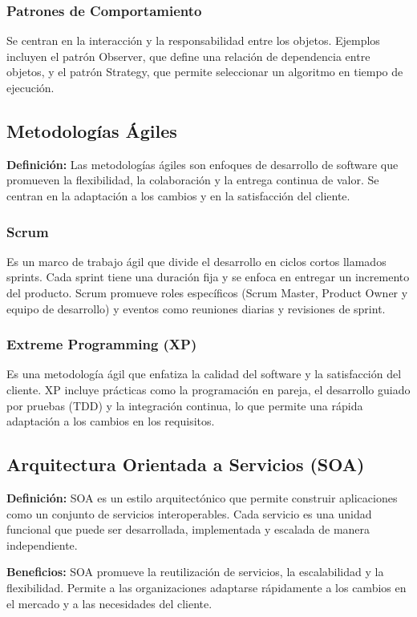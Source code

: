 \documentclass{article}
\begin{document}
\subsubsection{Patrones de Comportamiento}
Se centran en la interacción y la responsabilidad entre los objetos. Ejemplos incluyen el patrón Observer, que define una relación de dependencia entre objetos, y el patrón Strategy, que permite seleccionar un algoritmo en tiempo de ejecución.

\subsection{Metodologías Ágiles}
\textbf{Definición:} Las metodologías ágiles son enfoques de desarrollo de software que promueven la flexibilidad, la colaboración y la entrega continua de valor. Se centran en la adaptación a los cambios y en la satisfacción del cliente.

\subsubsection{Scrum}
Es un marco de trabajo ágil que divide el desarrollo en ciclos cortos llamados sprints. Cada sprint tiene una duración fija y se enfoca en entregar un incremento del producto. Scrum promueve roles específicos (Scrum Master, Product Owner y equipo de desarrollo) y eventos como reuniones diarias y revisiones de sprint.

\subsubsection{Extreme Programming (XP)}
Es una metodología ágil que enfatiza la calidad del software y la satisfacción del cliente. XP incluye prácticas como la programación en pareja, el desarrollo guiado por pruebas (TDD) y la integración continua, lo que permite una rápida adaptación a los cambios en los requisitos.

\subsection{Arquitectura Orientada a Servicios (SOA)}
\textbf{Definición:} SOA es un estilo arquitectónico que permite construir aplicaciones como un conjunto de servicios interoperables. Cada servicio es una unidad funcional que puede ser desarrollada, implementada y escalada de manera independiente.

\textbf{Beneficios:} SOA promueve la reutilización de servicios, la escalabilidad y la flexibilidad. Permite a las organizaciones adaptarse rápidamente a los cambios en el mercado y a las necesidades del cliente.
\end{document}
